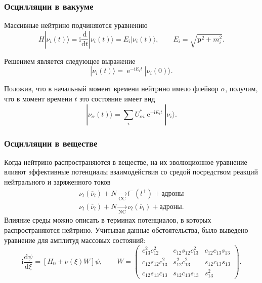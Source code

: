 \documentclass[utf8,9pt,mathserif,usepdftitle=false]{beamer}
\newcommand{\dd}{\mathrm{d}}
\renewcommand{\exp}{\operatorname{e}}
\renewcommand{\imath}{\mathrm{i}}
\newcommand\Vect[1]{{\boldsymbol{#1}}}
\begin{document}
\begin{frame}
  \frametitle{Осцилляции в вакууме}%
  Массивные нейтрино подчиняются уравнению
	\begin{equation}
		H|\nu_{i}(t)\rangle=\imath\frac{\dd}{\dd t}|\nu_{i}(t)\rangle=
		E_{i}|\nu_{i}(t)\rangle, \qquad E_{i}=\sqrt{\Vect{p}^{2}+m_{i}^{2}}.
	\end{equation}

	Решением является следующее выражение
	\begin{equation}
		|\nu_{i}(t)\rangle=\exp^{-\imath E_{i}t}|\nu_{i}(0)\rangle.
	\end{equation}

	Положив, что в начальный момент времени нейтрино имело флейвор
  \(\alpha\), получим, что в момент времени \(t\) это состояние имеет вид
	\begin{equation}
		|\nu_{\alpha}(t)\rangle=\sum_{i}U_{\alpha i}^{*}\exp^{-\imath E_{i}t}|\nu_{i}\rangle.
	\end{equation}
\end{frame}

\begin{frame}
	\frametitle{Осцилляции в веществе}%
	Когда нейтрино распространяются в веществе, на их эволюционное уравнение
  влияют эффективные потенциалы взаимодействия со средой посредством реакций
  нейтрального и заряженного токов
    \begin{align*}
  	\nu_{l}(\overline{\nu}_{l})+N\xrightarrow[\text{CC}]{}l^{-}(l^{+})+\text{адроны}\\[2ex]
  	\nu_{l}(\overline{\nu}_{l})+N\xrightarrow[\text{NC}]{}\nu_{l}(\overline{\nu}_{l})+\text{адроны}.
  \end{align*}
	Влияние среды можно описать в терминах потенциалов, в которых
	распространяются нейтрино. Учитывая данные обстоятельства, было выведено
	уравнение для амплитуд массовых состояний:
	\onslide<3->%
	\begin{equation}\label{eq:2}
		\imath\frac{\dd\psi}{\dd\xi}=[H_{0}+\nu(\xi)W]\psi, 
		\qquad
		 W=
		\begin{pmatrix}
			c_{13}^{2}c_{12}^{2} & c_{12}s_{12}c_{13}^{2} & c_{12}c_{13}s_{13}\\
			c_{12}s_{12}c_{13}^{2} & s_{12}^{2}c_{13}^{2} & s_{12}c_{13}s_{13}\\
			c_{12}s_{13}c_{13} & s_{12}c_{13}s_{13} & s_{13}^{2}
		\end{pmatrix}.
	\end{equation}
\end{frame}
\end{document}

